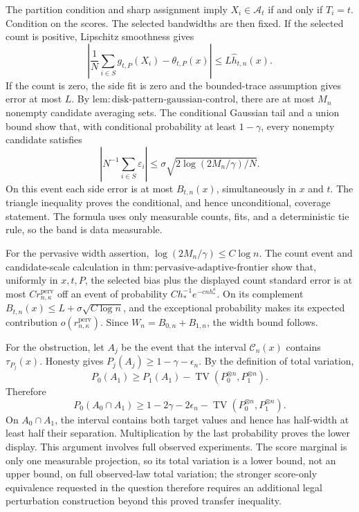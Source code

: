 The partition condition and sharp assignment imply \(X_i\in\mathcal A_t\) if and only if \(T_i=t\). Condition on the scores. The selected bandwidths are then fixed. If the selected count is positive, Lipschitz smoothness gives
\[
 \left|\frac1N\sum_{i\in S}g_{t,P}(X_i)-\theta_{t,P}(x)\right|
 \le L\widehat h_{t,n}(x).
\]
If the count is zero, the side fit is zero and the bounded-trace assumption gives error at most \(L\). By \(\mathrm{lem:disk\text{-}pattern\text{-}gaussian\text{-}control}\), there are at most \(M_n\) nonempty candidate averaging sets. The conditional Gaussian tail and a union bound show that, with conditional probability at least \(1-\gamma\), every nonempty candidate satisfies
\[
 \left|N^{-1}\sum_{i\in S}\varepsilon_i\right|
 \le\sigma\sqrt{2\log(2M_n/\gamma)/N}.
\]
On this event each side error is at most \(B_{t,n}(x)\), simultaneously in \(x\) and \(t\). The triangle inequality proves the conditional, and hence unconditional, coverage statement. The formula uses only measurable counts, fits, and a deterministic tie rule, so the band is data measurable.

For the pervasive width assertion, \(\log(2M_n/\gamma)\le C\log n\). The count event and candidate-scale calculation in \(\mathrm{thm:pervasive\text{-}adaptive\text{-}frontier}\) show that, uniformly in \(x,t,P\), the selected bias plus the displayed count standard error is at most \(Cr_{n,\kappa}^{\mathrm{perv}}\) off an event of probability \(Ch_*^{-1}e^{-cnh_*^\kappa}\). On its complement \(B_{t,n}(x)\le L+\sigma\sqrt{C\log n}\), and the exceptional probability makes its expected contribution \(o(r_{n,\kappa}^{\mathrm{perv}})\). Since \(W_n=B_{0,n}+B_{1,n}\), the width bound follows.

For the obstruction, let \(A_j\) be the event that the interval \(\mathcal C_n(x)\) contains \(\tau_{P_j}(x)\). Honesty gives \(P_j(A_j)\ge1-\gamma-\epsilon_n\). By the definition of total variation,
\[
 P_0(A_1)\ge P_1(A_1)-\operatorname{TV}(P_0^{\otimes n},P_1^{\otimes n}).
\]
Therefore
\[
 P_0(A_0\cap A_1)\ge1-2\gamma-2\epsilon_n-
 \operatorname{TV}(P_0^{\otimes n},P_1^{\otimes n}).
\]
On \(A_0\cap A_1\), the interval contains both target values and hence has half-width at least half their separation. Multiplication by the last probability proves the lower display. This argument involves full observed experiments. The score marginal is only one measurable projection, so its total variation is a lower bound, not an upper bound, on full observed-law total variation; the stronger score-only equivalence requested in the question therefore requires an additional legal perturbation construction beyond this proved transfer inequality.